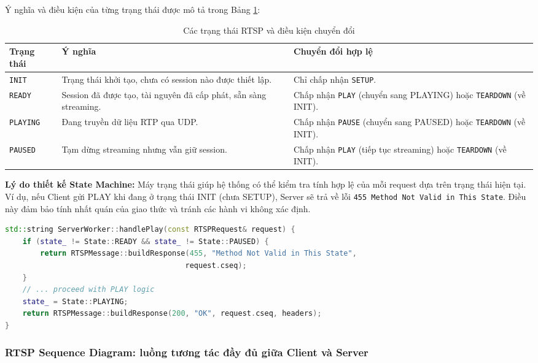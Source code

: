 Ý nghĩa và điều kiện của từng trạng thái được mô tả trong Bảng \ref{tab:rtsp_states}:

\FloatBarrier
\begin{table}[H]
\centering
\caption{Các trạng thái RTSP và điều kiện chuyển đổi}
\label{tab:rtsp_states}
\begin{tabular}{p{}p{}p{}}
\toprule
\textbf{Trạng thái} & \textbf{Ý nghĩa} & \textbf{Chuyển đổi hợp lệ} \\
\midrule
\texttt{INIT} & Trạng thái khởi tạo, chưa có session nào được thiết lập. & Chỉ chấp nhận \texttt{SETUP}. \\
\texttt{READY} & Session đã được tạo, tài nguyên đã cấp phát, sẵn sàng streaming. & Chấp nhận \texttt{PLAY} (chuyển sang PLAYING) hoặc \texttt{TEARDOWN} (về INIT). \\
\texttt{PLAYING} & Đang truyền dữ liệu RTP qua UDP. & Chấp nhận \texttt{PAUSE} (chuyển sang PAUSED) hoặc \texttt{TEARDOWN} (về INIT). \\
\texttt{PAUSED} & Tạm dừng streaming nhưng vẫn giữ session. & Chấp nhận \texttt{PLAY} (tiếp tục streaming) hoặc \texttt{TEARDOWN} (về INIT). \\
\bottomrule
\end{tabular}
\end{table}
\FloatBarrier

\textbf{Lý do thiết kế State Machine:} Máy trạng thái giúp hệ thống có thể kiểm tra tính hợp lệ của mỗi request dựa trên trạng thái hiện tại. Ví dụ, nếu Client gửi PLAY khi đang ở trạng thái INIT (chưa SETUP), Server sẽ trả về lỗi \texttt{455 Method Not Valid in This State}. Điều này đảm bảo tính nhất quán của giao thức và tránh các hành vi không xác định.

\begin{lstlisting}[language=C++, caption={Validation state trước khi xử lý PLAY request}, label={lst:state_validation}]
std::string ServerWorker::handlePlay(const RTSPRequest& request) {
    if (state_ != State::READY && state_ != State::PAUSED) {
        return RTSPMessage::buildResponse(455, "Method Not Valid in This State", 
                                         request.cseq);
    }
    // ... proceed with PLAY logic
    state_ = State::PLAYING;
    return RTSPMessage::buildResponse(200, "OK", request.cseq, headers);
}
\end{lstlisting}

\subsubsection{RTSP Sequence Diagram: luồng tương tác đầy đủ giữa Client và Server}


